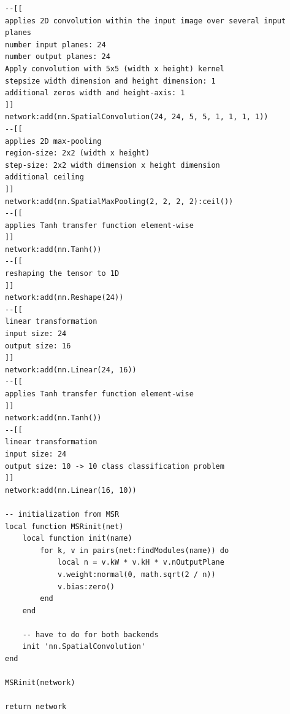 \documentclass[11pt, oneside]{report}
\begin{document}
\begin{lstlisting}
--[[
applies 2D convolution within the input image over several input planes
number input planes: 24
number output planes: 24
Apply convolution with 5x5 (width x height) kernel
stepsize width dimension and height dimension: 1
additional zeros width and height-axis: 1
]] 
network:add(nn.SpatialConvolution(24, 24, 5, 5, 1, 1, 1, 1))
--[[
applies 2D max-pooling
region-size: 2x2 (width x height)
step-size: 2x2 width dimension x height dimension
additional ceiling
]]
network:add(nn.SpatialMaxPooling(2, 2, 2, 2):ceil())
--[[
applies Tanh transfer function element-wise
]]
network:add(nn.Tanh())
--[[
reshaping the tensor to 1D
]]
network:add(nn.Reshape(24))
--[[
linear transformation
input size: 24
output size: 16
]]
network:add(nn.Linear(24, 16))
--[[
applies Tanh transfer function element-wise
]]
network:add(nn.Tanh())
--[[
linear transformation
input size: 24
output size: 10 -> 10 class classification problem 
]]
network:add(nn.Linear(16, 10))

-- initialization from MSR
local function MSRinit(net)
    local function init(name)
        for k, v in pairs(net:findModules(name)) do
            local n = v.kW * v.kH * v.nOutputPlane
            v.weight:normal(0, math.sqrt(2 / n))
            v.bias:zero()
        end
    end

    -- have to do for both backends
    init 'nn.SpatialConvolution'
end

MSRinit(network)

return network
\end{lstlisting}
\end{document}
